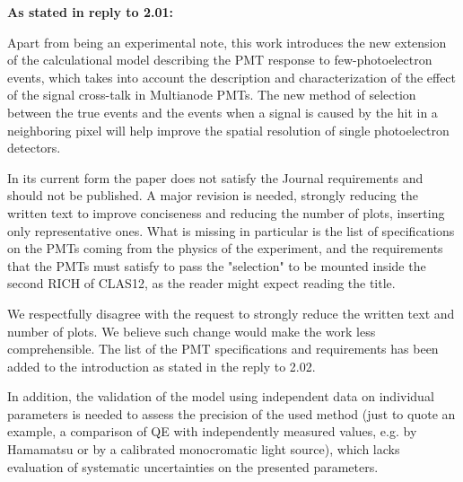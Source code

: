 \documentclass[11pt]{report}
\begin{document}
{\bfseries As stated in reply to 2.01:}

Apart from being an experimental note, this work introduces the new extension of the calculational model describing the PMT response to few-photoelectron events, which takes into account the description and characterization of the effect of the signal cross-talk in Multianode PMTs.
The new method of selection between the true events and the events when a signal is caused by the hit in a neighboring pixel will help improve the spatial resolution of single photoelectron detectors. 



\begin{tcolorbox}[enlarge top by=2em,colbacktitle=blue!60!white,colframe=black!80!white,left=0pt,right=0pt,top=0pt,bottom=0pt,boxrule=0.3pt,title=\bfseries2.11]
In its current form the paper does not satisfy the Journal requirements and should not be published. A major revision is needed, strongly reducing the written text to improve conciseness and reducing the number of plots, inserting only representative ones. What is missing in particular is the list of specifications on the PMTs coming from the physics of the experiment, and the requirements that the PMTs must satisfy to pass the "selection" to be mounted inside the second RICH of CLAS12, as the reader might expect reading the title.
\end{tcolorbox}

We respectfully disagree with the request to strongly reduce the written text and number of plots.
We believe such change would make the work less comprehensible.
The list of the PMT specifications and requirements has been added to the introduction as stated in the reply to 2.02.

\begin{tcolorbox}[enlarge top by=2em,colbacktitle=blue!60!white,colframe=black!80!white,left=0pt,right=0pt,top=0pt,bottom=0pt,boxrule=0.3pt,title=\bfseries2.12]
In addition, the validation of the model using independent data on individual parameters is needed to assess the precision of the used method (just to quote an example, a comparison of QE with independently measured values, e.g. by Hamamatsu or by a calibrated monocromatic light source), which lacks evaluation of systematic uncertainties on the presented parameters.
\end{tcolorbox}
\end{document}
